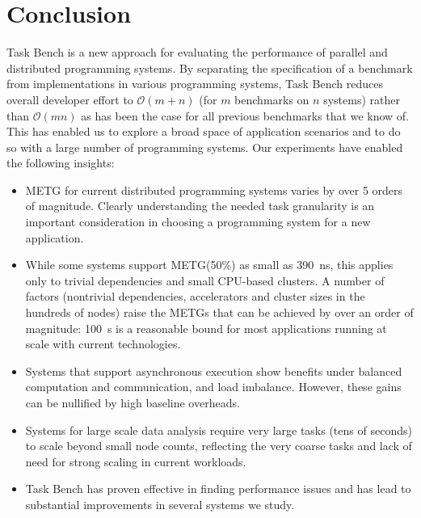 \section{Conclusion}
\label{sec:conclusion}

Task Bench is a new approach for evaluating the performance of
parallel and distributed programming systems. By separating the
specification of a benchmark from implementations in various
programming systems, Task Bench reduces overall developer effort to
$\mathcal{O}(m + n)$ (for $m$ benchmarks on $n$ systems) rather than
$\mathcal{O}(mn)$ as has been the case for all previous
benchmarks that we know of. This has enabled us to explore a broad space of
application scenarios and to do so with a large number of programming
systems. Our experiments have enabled the following
insights:

\begin{itemize}
\item METG for current distributed programming systems varies by over
  5 orders of magnitude.  Clearly understanding the needed task
  granularity is an important consideration in choosing a programming
  system for a new application.

\item While some systems support METG(50\%) as small as 390~ns, this applies only to trivial dependencies and small CPU-based clusters. A number of factors (nontrivial dependencies, accelerators and cluster sizes in the hundreds of nodes) raise
  the METGs that can be achieved by over an order of magnitude: 100~\textmu{}s is a reasonable bound for most applications running at scale with current technologies.

\item Systems that support asynchronous execution show benefits under
  balanced computation
  and communication, and load imbalance. However, these gains can be nullified by
  high baseline overheads.

\item Systems for large scale data analysis require very large tasks
  (tens of seconds) to scale beyond small node counts,
  reflecting the very coarse tasks and lack of need for strong scaling
  in current workloads.

\item Task Bench has proven effective in finding performance issues
  and has lead to substantial improvements in several systems
  we study.
\end{itemize}

